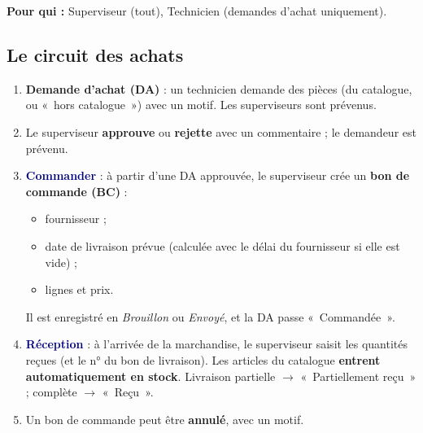 \documentclass[11pt,a4paper]{article}
\newcommand{\ui}[1]{\textbf{\textcolor{navy}{#1}}}          %
\begin{document}
\textbf{Pour qui :} Superviseur (tout), Technicien (demandes d'achat uniquement).

\subsection{Le circuit des achats}

\begin{center}
\end{center}

\begin{enumerate}
  \item \textbf{Demande d'achat (DA)} : un technicien demande des pièces (du catalogue, ou «~hors catalogue~») avec un motif. Les superviseurs sont prévenus.
  \item Le superviseur \textbf{approuve} ou \textbf{rejette} avec un commentaire ; le demandeur est prévenu.
  \item \ui{Commander} : à partir d'une DA approuvée, le superviseur crée un \textbf{bon de commande (BC)} :
    \begin{itemize}
      \item fournisseur ;
      \item date de livraison prévue (calculée avec le délai du fournisseur si elle est vide) ;
      \item lignes et prix.
    \end{itemize}
    Il est enregistré en \emph{Brouillon} ou \emph{Envoyé}, et la DA passe «~Commandée~».
  \item \ui{Réception} : à l'arrivée de la marchandise, le superviseur saisit les quantités reçues (et le n° du bon de livraison). Les articles du catalogue \textbf{entrent automatiquement en stock}. Livraison partielle $\rightarrow$ «~Partiellement reçu~» ; complète $\rightarrow$ «~Reçu~».
  \item Un bon de commande peut être \textbf{annulé}, avec un motif.
\end{enumerate}
\end{document}
